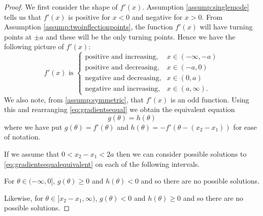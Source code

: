 		\begin{proof}
			We first consider the shape of $f'(x)$. Assumption \ref{assump:singlemode} tells us that $f'(x)$ is positive for $x<0$ and negative for $x>0$. 
			From Assumption \ref{assump:twoinflectionpoints}, the function $f'(x)$ will have turning points at $\pm a$ and these will be the only turning points.
			Hence we have the following picture of $f'(x)$:
			\begin{equation}
				f'(x) \text{ is } 
				\begin{cases}
					\text{positive and increasing,} &x \in (-\infty,-a)\\
					\text{positive and decreasing,} &x \in (-a,0)\\
					\text{negative and decreasing,} &x \in (0,a)\\
					\text{negative and increasing,} &x \in (a,\infty).
				\end{cases}
			\end{equation}
			We also note, from \ref{assump:symmetric}, that $f'(x)$ is an odd function. Using this and rearranging \eqref{eq:gradientsequal} we obtain the equivalent equation
			\begin{equation}
				g(\theta) = h(\theta)
				\label{eq:gradientsequalequivalent}
			\end{equation}
			where we have put $g(\theta) = f'(\theta)$ and $h(\theta) = -f'(\theta - (x_2 - x_1))$ for ease of notation.
			
			If we assume that $0< x_2 - x_1 < 2a$ then we can consider possible solutions to \eqref{eq:gradientsequalequivalent} on each of the following intervals. 
			
			For $\theta \in (-\infty, 0]$, $g(\theta)\geq 0$ and $h(\theta) < 0$ and so there are no possible solutions.
			
			Likewise, for $\theta \in [x_2 - x_1,\infty)$, $g(\theta)<0$ and $h(\theta) \geq 0$ and so there are no possible solutions.
			

\end{proof}
